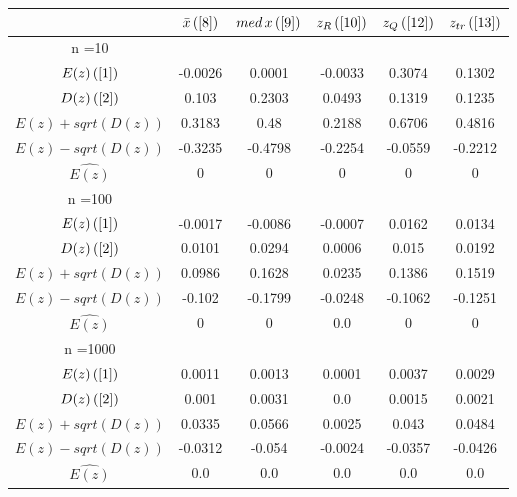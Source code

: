 \begin{tabular}{|c|c|c|c|c|c|}
\hline
 & $\bar{x} \, (\ref{8})$ & $med \, x \, (\ref{9})$ & $z_R \, (\ref{10})$ & $z_Q \, (\ref{12})$ & $z_{tr} \, (\ref{13})$ \\
\hline
n =10 &  &  &  &  & \\
\hline
$E(z) \, (\ref{1})$ & -0.0026 & 0.0001 & -0.0033 & 0.3074 & 0.1302\\
\hline
$D(z) \, (\ref{2})$ & 0.103 & 0.2303 & 0.0493 & 0.1319 & 0.1235\\
\hline
$E(z)+sqrt(D(z))$ & 0.3183 & 0.48 & 0.2188 & 0.6706 & 0.4816\\
\hline
$E(z)-sqrt(D(z))$ & -0.3235 & -0.4798 & -0.2254 & -0.0559 & -0.2212\\
\hline
$\hat{E(z)}$ & 0 & 0 & 0 & 0 & 0\\
\hline
n =100 &  &  &  &  & \\
\hline
$E(z) \, (\ref{1})$ & -0.0017 & -0.0086 & -0.0007 & 0.0162 & 0.0134\\
\hline
$D(z) \, (\ref{2})$ & 0.0101 & 0.0294 & 0.0006 & 0.015 & 0.0192\\
\hline
$E(z)+sqrt(D(z))$ & 0.0986 & 0.1628 & 0.0235 & 0.1386 & 0.1519\\
\hline
$E(z)-sqrt(D(z))$ & -0.102 & -0.1799 & -0.0248 & -0.1062 & -0.1251\\
\hline
$\hat{E(z)}$ & 0 & 0 & 0.0 & 0 & 0\\
\hline
n =1000 &  &  &  &  & \\
\hline
$E(z) \, (\ref{1})$ & 0.0011 & 0.0013 & 0.0001 & 0.0037 & 0.0029\\
\hline
$D(z) \, (\ref{2})$ & 0.001 & 0.0031 & 0.0 & 0.0015 & 0.0021\\
\hline
$E(z)+sqrt(D(z))$ & 0.0335 & 0.0566 & 0.0025 & 0.043 & 0.0484\\
\hline
$E(z)-sqrt(D(z))$ & -0.0312 & -0.054 & -0.0024 & -0.0357 & -0.0426\\
\hline
$\hat{E(z)}$ & 0.0 & 0.0 & 0.0 & 0.0 & 0.0\\
\hline
\end{tabular}